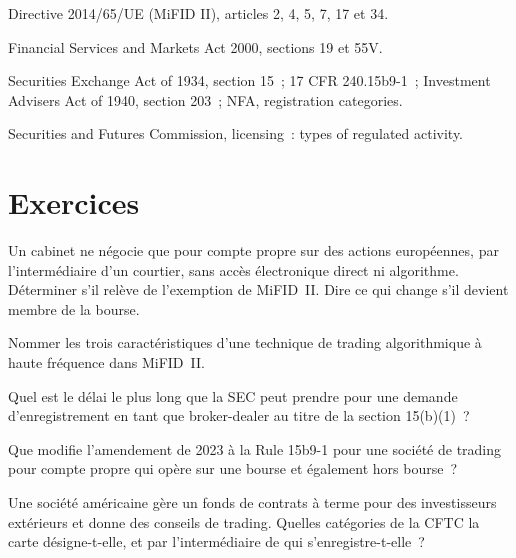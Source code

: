 \begin{omsources}
\item Directive 2014/65/UE (MiFID II), articles 2, 4, 5, 7, 17 et 34.
\item Financial Services and Markets Act 2000, sections 19 et 55V.
\item Securities Exchange Act of 1934, section 15~; 17 CFR 240.15b9-1~; Investment Advisers Act of 1940, section 203~; NFA, registration categories.
\item Securities and Futures Commission, licensing~: types of regulated activity.
\end{omsources}

\section{Exercices}

\begin{exercise}[$\star$]\label{exo:fm:regulators-and-licences:1}
Un cabinet ne négocie que pour compte propre sur des actions européennes, par l'intermédiaire d'un courtier, sans accès électronique direct ni algorithme. Déterminer s'il relève de l'exemption
de MiFID~II. Dire ce qui change s'il devient membre de la bourse.
\end{exercise}

\begin{exercise}[$\star$]\label{exo:fm:regulators-and-licences:2}
Nommer les trois caractéristiques d'une technique de trading algorithmique à haute fréquence dans MiFID~II.
\end{exercise}

\begin{exercise}[$\star$]\label{exo:fm:regulators-and-licences:3}
Quel est le délai le plus long que la SEC peut prendre pour une demande d'enregistrement en tant que broker-dealer au titre de la section 15(b)(1)~?
\end{exercise}

\begin{exercise}[$\star\star$]\label{exo:fm:regulators-and-licences:4}
Que modifie l'amendement de 2023 à la Rule 15b9-1 pour une société de trading pour compte propre qui opère sur une bourse et également hors bourse~?
\end{exercise}

\begin{exercise}[$\star\star$]\label{exo:fm:regulators-and-licences:5}
Une société américaine gère un fonds de contrats à terme pour des investisseurs extérieurs et donne des conseils de trading. Quelles catégories de la CFTC la carte désigne-t-elle, et par l'intermédiaire de qui
s'enregistre-t-elle~?
\end{exercise}

